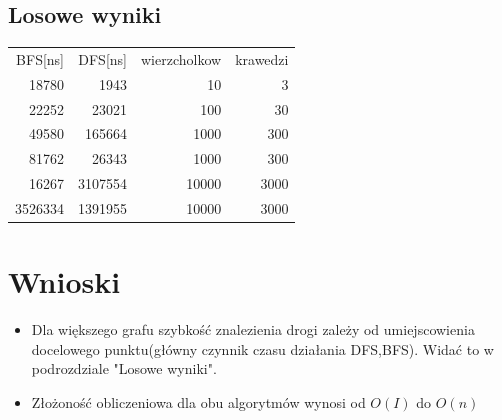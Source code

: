 \documentclass[a4paper,11pt]{article}
\begin{document}
\subsection{Losowe wyniki}
\begin{tabular}{|r|r|r|r} \hline
BFS[ns] &DFS[ns]   &wierzcholkow &krawedzi\\    
18780& 1943&	10&				3\\
22252& 23021& 100&             30\\
49580& 165664& 1000&          300\\
81762&  26343& 1000&          300\\
16267& 3107554& 10000&       3000\\
3526334& 1391955& 10000&    3000\\ \hline
\end{tabular}
\section{Wnioski}
\begin{itemize}
\item Dla większego grafu szybkość znalezienia drogi zależy od umiejscowienia docelowego punktu(główny czynnik czasu działania DFS,BFS). Widać to w podrozdziale "Losowe wyniki".
\item Złożoność obliczeniowa dla obu algorytmów wynosi od 
$O(I)
$
do
$O(n)
$
\end{itemize}
\end{document}
